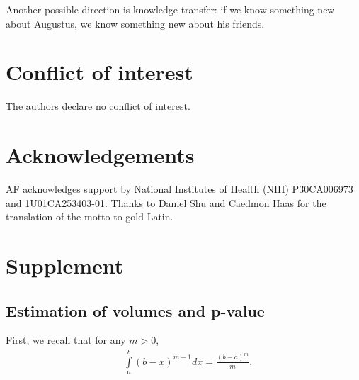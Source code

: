 \documentclass{llncs}
\begin{document}
Another possible direction is knowledge transfer: if we know something new about Augustus, we know something new about his friends. 




\section{Conflict of interest}
The authors declare no conflict of interest.

\section{Acknowledgements}
AF acknowledges support by National Institutes of Health (NIH) P30CA006973 and 1U01CA253403-01.
Thanks to Daniel Shu and Caedmon Haas for the translation of the motto to gold Latin. 





\newcommand{\beginsupplement}{%
        \setcounter{table}{0}
        \renewcommand{\thetable}{S\arabic{table}}%
        \setcounter{figure}{0}
        \renewcommand{\thefigure}{S\arabic{figure}}
        \setcounter{equation}{0}
        \renewcommand{\theequation}{S\arabic{equation}}%
     }

\newpage
\section*{Supplement}
\beginsupplement
\subsection{Estimation of volumes and p-value}
\label{seq:inference}
First, we recall that for any $m > 0$,
\begin{eqnarray}
&\displaystyle \int \limits_a^b \left(b-x\right)^{m-1}dx=
\displaystyle \frac{\left(b-a\right)^m}{m} . \label{eq:intab}
\end{eqnarray} 
\end{document}
